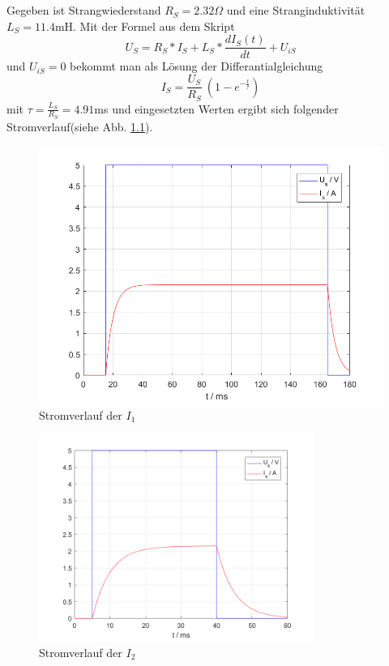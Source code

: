 \chapter{}\label{ex:aufg2}

\section{}\label{sec:aufg2a}

%
Gegeben ist Strangwiederstand $R_S = 2.32 \Omega$ und eine Stranginduktivität $L_S= 11.4$mH.
Mit der Formel aus dem Skript
\begin{equation}
	U_S = R_S * I_S + L_S * \frac{dI_S(t)}{dt} + U_{iS}
\end{equation}
und $U_{iS} = 0$ bekommt man als Lösung der Differantialgleichung
\begin{equation}
	I_S = \frac{U_S}{R_S}~( 1 - e^{-\frac{t}{\tau}})
\end{equation}
mit $\tau = \frac{L_S}{R_S} = 4.91$ms und eingesetzten Werten ergibt sich folgender Stromverlauf(siehe Abb. \ref{fig:2a_stromverlauf_I1}).
\begin{figure}[htb]
	\includegraphics[width=\textwidth]{./Bilder/2a_Stromverlauf_1}
	\caption{Stromverlauf der $I_1$}
	\label{fig:2a_stromverlauf_I1}
\end{figure}

\begin{figure}[!h]
	\centering
	\includegraphics[width=0.8\textwidth]{./Bilder/2a_Stromverlauf_2}
	\caption{Stromverlauf der $I_2$}
	\label{fig:2a_stromverlauf_I2}
\end{figure}


